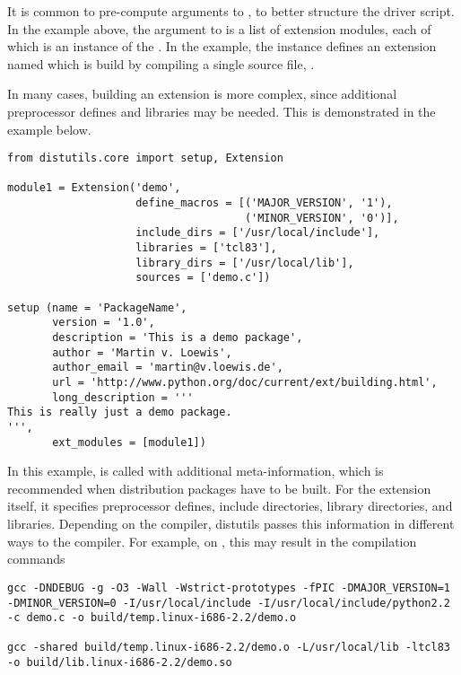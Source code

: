 It is common to pre-compute arguments to , to better
structure the driver script. In the example above,
the argument to  is a list of
extension modules, each of which is an instance of the
. In the example, the instance defines an extension
named  which is build by compiling a single source file,
.

In many cases, building an extension is more complex, since additional
preprocessor defines and libraries may be needed. This is demonstrated
in the example below.

\begin{verbatim}
from distutils.core import setup, Extension

module1 = Extension('demo',
                    define_macros = [('MAJOR_VERSION', '1'),
                                     ('MINOR_VERSION', '0')],
                    include_dirs = ['/usr/local/include'],
                    libraries = ['tcl83'],
                    library_dirs = ['/usr/local/lib'],
                    sources = ['demo.c'])

setup (name = 'PackageName',
       version = '1.0',
       description = 'This is a demo package',
       author = 'Martin v. Loewis',
       author_email = 'martin@v.loewis.de',
       url = 'http://www.python.org/doc/current/ext/building.html',
       long_description = '''
This is really just a demo package.
''',
       ext_modules = [module1])

\end{verbatim}

In this example,  is called with additional
meta-information, which is recommended when distribution packages have
to be built. For the extension itself, it specifies preprocessor
defines, include directories, library directories, and libraries.
Depending on the compiler, distutils passes this information in
different ways to the compiler. For example, on \UNIX{}, this may
result in the compilation commands

\begin{verbatim}
gcc -DNDEBUG -g -O3 -Wall -Wstrict-prototypes -fPIC -DMAJOR_VERSION=1 -DMINOR_VERSION=0 -I/usr/local/include -I/usr/local/include/python2.2 -c demo.c -o build/temp.linux-i686-2.2/demo.o

gcc -shared build/temp.linux-i686-2.2/demo.o -L/usr/local/lib -ltcl83 -o build/lib.linux-i686-2.2/demo.so
\end{verbatim}

